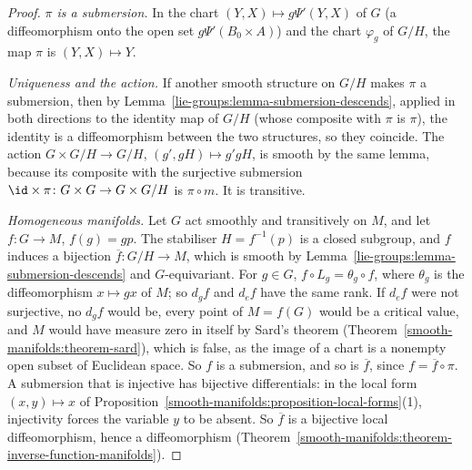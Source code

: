 \begin{proof}
\emph{$\pi$ is a submersion.} In the chart $(Y, X) \mapsto g\Psi'(Y, X)$ of $G$ (a diffeomorphism onto the open set $g\Psi'(B_0 \times A)$) and the chart
$\varphi_g$ of $G/H$, the map $\pi$ is $(Y, X) \mapsto Y$.

\emph{Uniqueness and the action.} If another smooth structure on $G/H$ makes $\pi$ a submersion, then by Lemma~\ref{lie-groups:lemma-submersion-descends},
applied in both directions to the identity map of $G/H$ (whose composite with $\pi$ is $\pi$), the identity is a diffeomorphism between the two structures, so
they coincide. The action $G \times G/H \to G/H$, $(g', gH) \mapsto g'gH$, is smooth by the same lemma, because its composite with the surjective submersion
$\id \times \pi \colon G \times G \to G \times G/H$ is $\pi \circ m$. It is transitive.

\emph{Homogeneous manifolds.} Let $G$ act smoothly and transitively on $M$, and let $f \colon G \to M$, $f(g) = gp$. The stabiliser $H = f^{-1}(p)$ is a
closed subgroup, and $f$ induces a bijection $\overline{f} \colon G/H \to M$, which is smooth by Lemma~\ref{lie-groups:lemma-submersion-descends} and
$G$-equivariant. For $g \in G$, $f \circ L_g = \theta_g \circ f$, where $\theta_g$ is the diffeomorphism $x \mapsto gx$ of $M$; so $d_gf$ and $d_ef$ have the
same rank. If $d_ef$ were not surjective, no $d_gf$ would be, every point of $M = f(G)$ would be a critical value, and $M$ would have measure zero in itself by
Sard's theorem (Theorem~\ref{smooth-manifolds:theorem-sard}), which is false, as the image of a chart is a nonempty open subset of Euclidean space. So $f$ is a
submersion, and so is $\overline{f}$, since $f = \overline{f} \circ \pi$. A submersion that is injective has bijective differentials: in the local form
$(x, y) \mapsto x$ of Proposition~\ref{smooth-manifolds:proposition-local-forms}(1), injectivity forces the variable $y$ to be absent. So $\overline{f}$ is a
bijective local diffeomorphism, hence a diffeomorphism (Theorem~\ref{smooth-manifolds:theorem-inverse-function-manifolds}).
\end{proof}

